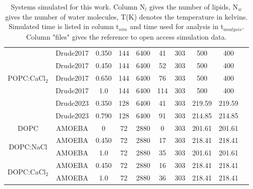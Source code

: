 \documentclass[journal=jacsat,manuscript=article,layout=singlecolumn]{achemso}
\begin{document}
\begin{table}[]
\begin{small}
\begin{tabular}{cccccccccc}
	\multirow{5}{*}{POPC:CaCl$_{2}$} & Drude2017 & 0.350   & 144      & 6400     & 41         & 303   & 500             & 400                  & \cite{kav_batuhan_2020_7600827}   \\
				  & Drude2017 & 0.450   & 144      & 6400     & 52         & 303   & 500             & 400                  & \cite{kav_batuhan_2020_7605016}   \\
				  & Drude2017 & 0.650   & 144      & 6400     & 76         & 303   & 500             & 400                  & \cite{kav_batuhan_2020_7604040} \\
				  & Drude2017 & 1.0   & 144      & 6400     & 114         & 303   & 500             & 400                  & \cite{kav_batuhan_2023_7658975}\\
                    & Drude2023 & 0.350 & 128      & 6400     & 41          & 303   & 219.59          & 219.59               & \cite{kav_batuhan_2023_8000065}\\
                    & Drude2023 & 0.790 & 128      & 6400     & 91          & 303   & 214.85          & 214.85               & \cite{kav_batuhan_2023_7992137} \\ \hline
DOPC           & AMOEBA   & 0 & 72 & 2880 & 0 & 303 & 201.61 & 201.61 & \cite{kav_batuhan_2022_7604681} \\ \hline
\multirow{2}{*}{DOPC:NaCl} & AMOEBA & 0.450 & 72 & 2880 & 17 & 303 & 218.41 & 218.41 & \cite{kav_batuhan_2022_7604711} \\
                           & AMOEBA & 1.0 & 72 & 2880 &  35 & 303 & 201.61 & 201.61 & \cite{kav_batuhan_2023_7625844} \\ \hline
\multirow{2}{*}{DOPC:CaCl$_{2}$} & AMOEBA  & 0.450 & 72 & 2880 & 16 & 303 & 218.41 & 218.41 & \cite{kav_batuhan_2022_7604842} \\
                                 & AMOEBA & 1.0 & 72 & 2880  & 36 & 303 & 218.41 & 218.41 & \cite{kav_batuhan_2022_7604810}
				  
\end{tabular}
\end{small}
\caption{Systems simulated for this work. Column N$_l$ gives the number of lipids, N$_w$ gives the number of water molecules, T(K) denotes the temperature in kelvins. Simulated time is listed in column t$_{sim}$ and time used for analysis in t$_{analysis}$. Column "files" gives the reference to open access simulation data.}
\label{table:sim_details}
\end{table}
\end{document}
